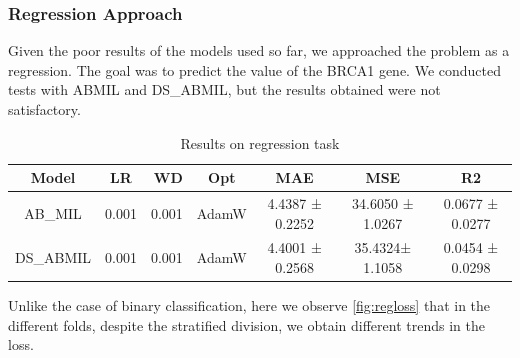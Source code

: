 \documentclass{article}
\begin{document}
\subsubsection{Regression Approach}
Given the poor results of the models used so far, we approached the problem as a regression. The goal was to predict the value of the BRCA1 gene. We conducted tests with ABMIL and DS\_ABMIL, but the results obtained were not satisfactory.

\begin{table}[h]
	\centering
	\begin{tabular}{|c|crc|c|c|c|}
		\hline
		Model & LR & WD & Opt & MAE & MSE & R2 \\ 
		\hline
		AB\_MIL & 0.001 & 0.001 & AdamW & 4.4387 ± 0.2252 & 34.6050 ± 1.0267 & 0.0677 ± 0.0277 \\
		DS\_ABMIL & 0.001 & 0.001 & AdamW & 4.4001 ± 0.2568 & 35.4324± 1.1058 & 0.0454 ± 0.0298 \\ 
		\hline
	\end{tabular}
	\caption{Results on regression task}
\end{table}

Unlike the case of binary classification, here we observe \ref{fig:regloss} that in the different folds, despite the stratified division, we obtain different trends in the loss.
\end{document}
